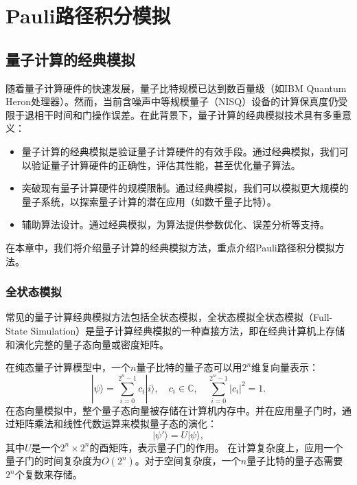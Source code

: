 \chapter{Pauli路径积分模拟}



\section{量子计算的经典模拟}
随着量子计算硬件的快速发展，量子比特规模已达到数百量级（如IBM Quantum Heron处理器）。然而，当前含噪声中等规模量子（NISQ）设备的计算保真度仍受限于退相干时间和门操作误差。在此背景下，量子计算的经典模拟技术具有多重意义：
\begin{itemize}
    \item 量子计算的经典模拟是验证量子计算硬件的有效手段。通过经典模拟，我们可以验证量子计算硬件的正确性，评估其性能，甚至优化量子算法。
    \item 突破现有量子计算硬件的规模限制。通过经典模拟，我们可以模拟更大规模的量子系统，以探索量子计算的潜在应用（如数千量子比特）。
    \item 辅助算法设计。通过经典模拟，为算法提供参数优化、误差分析等支持。
\end{itemize}
在本章中，我们将介绍量子计算的经典模拟方法，重点介绍Pauli路径积分模拟方法。


\subsection{全状态模拟}
常见的量子计算经典模拟方法包括全状态模拟，全状态模拟全状态模拟（Full-State Simulation）是量子计算经典模拟的一种直接方法，即在经典计算机上存储和演化完整的量子态向量或密度矩阵。

在纯态量子计算模型中，一个$n$量子比特的量子态可以用$2^n$维复向量表示：
\begin{equation}
    |\psi\rangle = \sum_{i=0}^{2^n-1} c_i |i\rangle,
    \quad c_i \in \mathbb{C}, \quad \sum_{i=0}^{2^n-1} |c_i|^2 = 1.
\end{equation}
在态向量模拟中，整个量子态向量被存储在计算机内存中。并在应用量子门时，通过矩阵乘法和线性代数运算来模拟量子态的演化：
\begin{equation}
    |\psi'\rangle = U |\psi\rangle,
\end{equation}
其中$U$是一个$2^n \times 2^n$的酉矩阵，表示量子门的作用。
在计算复杂度上，应用一个量子门的时间复杂度为$O(2^n)$。对于空间复杂度，一个$n$量子比特的量子态需要$2^n$个复数来存储。

